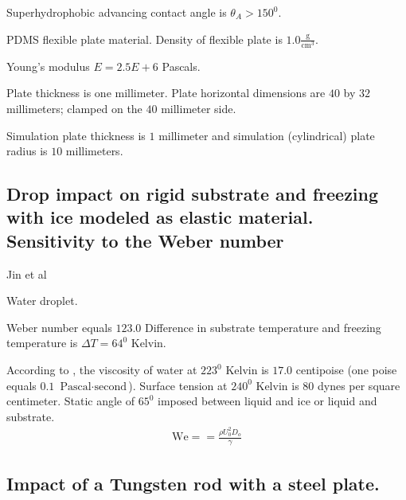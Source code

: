 \documentclass[]{article}
\begin{document}
Superhydrophobic advancing contact angle is $\theta_{A}> 150^{0}$.

PDMS flexible plate material.  Density of flexible plate is 
$1.0\frac{\mbox{g}}{\mbox{cm}^{3}}$.

Young's modulus $E=2.5E+6$ Pascals.

Plate thickness is one millimeter.  Plate horizontal dimensions are $40$ by 
$32$ millimeters; clamped on the $40$ millimeter side.   

Simulation plate thickness is $1$ millimeter and simulation (cylindrical) 
plate radius is $10$ millimeters.

\subsection{Drop impact on rigid substrate and freezing with ice 
  modeled as elastic material. Sensitivity to the Weber number}

Jin et al\cite{jin2025instantaneous}

Water droplet.

Weber number equals $123.0$
Difference in substrate temperature and freezing temperature is
$\Delta T=64^{0}$ Kelvin.

According to \cite{dehaoui2015viscosity}, the
viscosity of water at $223^{0}$ Kelvin is $17.0$ centipoise 
(one poise equals $0.1$ $\mbox{Pascal}\cdot\mbox{second}$).
Surface tension at $240^{0}$ Kelvin is $80$ dynes per square centimeter.
Static angle of $65^{0}$
imposed between liquid and ice or liquid and substrate.
\begin{eqnarray}
\mbox{We}==\frac{\rho U_{0}^{2}D_{o}}{\gamma}
\end{eqnarray}

\subsection{Impact of a Tungsten rod with a steel plate. }

\cite{tran2004particle}


\end{document}
